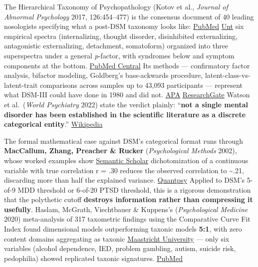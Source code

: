 The Hierarchical Taxonomy of Psychopathology (Kotov et al., \emph{Journal of Abnormal Psychology} 2017, 126:454--477) is the consensus document of 40 leading nosologists specifying what a post-DSM taxonomy looks like: \href{https://pubmed.ncbi.nlm.nih.gov/28333488/}{PubMed} \href{https://class.unt.edu/hitop/images/hitop.unt.edu/files/kotov_et_al_2017_-_hitop.pdf}{Unt} six empirical spectra (internalizing, thought disorder, disinhibited externalizing, antagonistic externalizing, detachment, somatoform) organized into three superspectra under a general \emph{p}-factor, with syndromes below and symptom components at the bottom. \href{https://pmc.ncbi.nlm.nih.gov/articles/PMC6859953/}{PubMed Central} Its methods --- confirmatory factor analysis, bifactor modeling, Goldberg's bass-ackwards procedure, latent-class-vs-latent-trait comparisons across samples up to 43,093 participants --- represent what DSM-III could have done in 1980 and did not. \href{https://www.apa.org/pubs/journals/features/abn-abn0000258.pdf}{APA} \href{https://www.researchgate.net/publication/315591130_The_Hierarchical_Taxonomy_of_Psychopathology_HiTOP_A_Dimensional_Alternative_to_Traditional_Nosologies}{ResearchGate} Watson et al.~(\emph{World Psychiatry} 2022) state the verdict plainly: ``\textbf{not a single mental disorder has been established in the scientific literature as a discrete categorical entity}.'' \href{https://en.wikipedia.org/wiki/Hierarchical_Taxonomy_of_Psychopathology}{Wikipedia}

The formal mathematical case against DSM's categorical format runs through \textbf{MacCallum, Zhang, Preacher \& Rucker} (\emph{Psychological Methods} 2002), whose worked examples show \href{https://www.semanticscholar.org/paper/On-the-practice-of-dichotomization-of-quantitative-Maccallum-Zhang/67646d3def337c40bbfa2476f0f1ff785ae18242}{Semantic Scholar} dichotomization of a continuous variable with true correlation r = .30 reduces the observed correlation to \textasciitilde.21, discarding more than half the explained variance. \href{https://quantpsy.org/pubs/maccallum_zhang_preacher_rucker_2002.pdf}{Quantpsy} Applied to DSM's 5-of-9 MDD threshold or 6-of-20 PTSD threshold, this is a rigorous demonstration that the polythetic cutoff \textbf{destroys information rather than compressing it usefully}. Haslam, McGrath, Viechtbauer \& Kuppens's (\emph{Psychological Medicine} 2020) meta-analysis of 317 taxometric findings using the Comparative Curve Fit Index found dimensional models outperforming taxonic models \textbf{5:1}, with zero content domains aggregating as taxonic \href{https://cris.maastrichtuniversity.nl/en/publications/dimensions-over-categories-a-meta-analysis-of-taxometric-research/}{Maastricht University} --- only six variables (alcohol dependence, IED, problem gambling, autism, suicide risk, pedophilia) showed replicated taxonic signatures. \href{https://pubmed.ncbi.nlm.nih.gov/32493520/}{PubMed}

